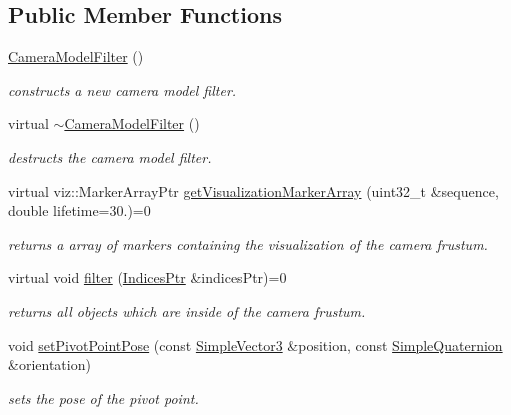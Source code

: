 \subsection*{\-Public \-Member \-Functions}
\begin{DoxyCompactItemize}
\item 
\hyperlink{classnext__best__view_1_1CameraModelFilter_a48e633d374a546db1b1f6fedd8aabcda}{\-Camera\-Model\-Filter} ()
\begin{DoxyCompactList}\small\item\em constructs a new camera model filter. \end{DoxyCompactList}\item 
virtual \hyperlink{classnext__best__view_1_1CameraModelFilter_ad5705648a0e3ab194f458c08ae02721a}{$\sim$\-Camera\-Model\-Filter} ()
\begin{DoxyCompactList}\small\item\em destructs the camera model filter. \end{DoxyCompactList}\item 
virtual viz\-::\-Marker\-Array\-Ptr \hyperlink{classnext__best__view_1_1CameraModelFilter_a0c8b846280f21a94ca69c694a3214ad1}{get\-Visualization\-Marker\-Array} (uint32\-\_\-t \&sequence, double lifetime=30.)=0
\begin{DoxyCompactList}\small\item\em returns a array of markers containing the visualization of the camera frustum. \end{DoxyCompactList}\item 
virtual void \hyperlink{classnext__best__view_1_1CameraModelFilter_ae8cbc5f9451ea9e32ff6942ce9f89a87}{filter} (\hyperlink{namespacenext__best__view_a89edd5f370254b5c7689adfede9fe6a7}{\-Indices\-Ptr} \&indices\-Ptr)=0
\begin{DoxyCompactList}\small\item\em returns all objects which are inside of the camera frustum. \end{DoxyCompactList}\item 
void \hyperlink{classnext__best__view_1_1CameraModelFilter_a953c8d38411573ef015b8c60c1fcc42c}{set\-Pivot\-Point\-Pose} (const \hyperlink{namespacenext__best__view_a59fc75b908e198bc02a9b19ba88edf12}{\-Simple\-Vector3} \&position, const \hyperlink{namespacenext__best__view_a165f1f159539ff8e583fb7fe3620390c}{\-Simple\-Quaternion} \&orientation)
\begin{DoxyCompactList}\small\item\em sets the pose of the pivot point. \end{DoxyCompactList}\item 

\end{DoxyCompactItemize}
